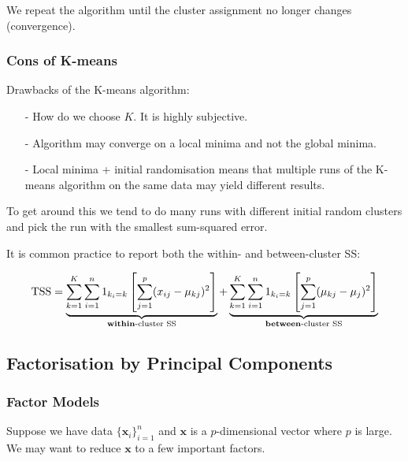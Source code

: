 \documentclass[11pt]{article}
\begin{document}
We repeat the algorithm until the cluster assignment no longer changes (convergence).

\subsubsection{Cons of K-means}

\begin{shaded}
    Drawbacks of the K-means algorithm:

    \begin{itemize}
        \item[-] How do we choose $K$. It is highly subjective.
        \item[-] Algorithm may converge on a local minima and not the global minima.
        \item[-] Local minima + initial randomisation means that multiple runs of the K-means algorithm on the same data may yield different results. 
    \end{itemize}

    To get around this we tend to do many runs with different initial random clusters and pick the run with the smallest sum-squared error.
\end{shaded}

It is common practice to report both the within- and between-cluster SS:

\begin{equation}
    \text{TSS} = \underbrace{\sum_{k=1}^K \sum_{i=1}^n 1 _{k_i = k}\left[\sum_{j=1}^p (x_{ij} - \mu_{kj})^2\right]}_{\text{\textbf{within}-cluster SS}} + \underbrace{\sum_{k=1}^K \sum_{i=1}^n 1 _{k_i = k}\left[\sum_{j=1}^p (\mu_{kj} - \mu_{j})^2\right]}_{\text{\textbf{between}-cluster SS}}
\end{equation}





\subsection{Factorisation by Principal Components}

\subsubsection{Factor Models}

Suppose we have data $\{\mathbf{x}_i\}_{i=1}^n$ and $\mathbf{x}$ is a $p$-dimensional vector where $p$ is large. We may want to reduce $\mathbf{x}$ to a few important factors.
\end{document}
